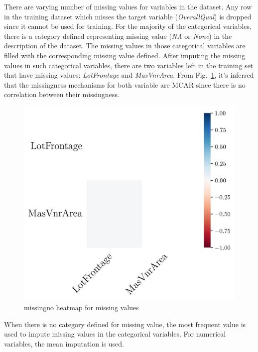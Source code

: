\documentclass[conference]{IEEEtran}
\begin{document}
There are varying number of missing values for variables in the dataset.
Any row in the training dataset which misses the target variable (\textit{OverallQual}) 
is dropped since it cannot be used for training.
For the majority of the categorical variables, there is a category defined representing
missing value (\textit{NA} or \textit{None}) in the description of the dataset.
The missing values in those categorical variables are filled with the corresponding missing 
value defined. After imputing the missing values in such categorical variables, there are
two variables left in the training set that have missing values: \textit{LotFrontage} and \textit{MasVnrArea}.
From Fig.~\ref{fig:missing-heatmap}, it's inferred that the missingness mechanisms 
for both variable are MCAR since there is no correlation between their missingness.
\begin{figure}[htbp]
    \centerline{\includegraphics[width = 0.4 \textwidth]{missingno-heatmap.png}}
    \caption{missingno \cite{Bilogur2018} heatmap for missing values}
    \label{fig:missing-heatmap}
\end{figure}
When there is no category defined for missing value, the most frequent value is 
used to impute missing values in the categorical variables.
For numerical variables, the mean imputation is used.
\end{document}
